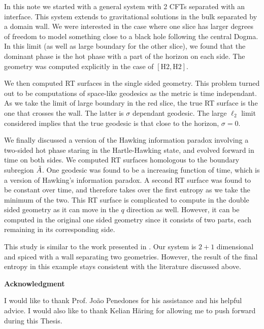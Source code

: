In this note we started with a general system with 2 CFTs separated with an interface. This system extends to gravitational solutions in the bulk separated by a domain wall. We were interested in the case where one slice has larger degrees of freedom to model something close to a black hole following the central Dogma. In this limit (as well as large boundary for the other slice), we found that the dominant phase is the hot phase with a part of the horizon on each side. The geometry was computed explicitly in the case of $[\text{H}2,\text{H}2]$. 

We then computed RT surfaces in the single sided geometry. This problem turned out to be computations of space-like geodesics as the metric is time independant. As we take the limit of large boundary in the red slice, the true RT surface is the one that crosses the wall. The latter is $\sigma$ dependant geodesic. The large $\ell_2$ limit considered implies that the true geodesic is that close to the horizon, $\sigma=0$.

We finally discussed a version of the Hawking information paradox involving a two-sided hot phase staring in the Hartle-Hawking state, and evolved forward in time on both sides. We computed RT surfaces homologous to the boundary subregion $\Tilde{A}$. One geodesic was found to be a increasing function of time, which is a version of Hawking's information paradox. A second RT surface was found to be constant over time, and therefore takes over the first entropy as we take the minimum of the two. This RT surface is complicated to compute in the double sided geometry as it can move in the $q$ direction as well. However, it can be computed in the original one sided geometry since it consists of two parts, each remaining in its corresponding side.

This study is similar to the work presented in \cite{almheiri2019islands}. Our system is $2+1$ dimensional and spiced with a wall separating two geometries. However, the result of the final entropy in this example stays consistent with the literature discussed above.


\textbf{Acknowledgment}

I would like to thank Prof. João Penedones for his assistance and his helpful advice.
I would also like to thank Kelian Häring for allowing me to push forward
during this Thesis.